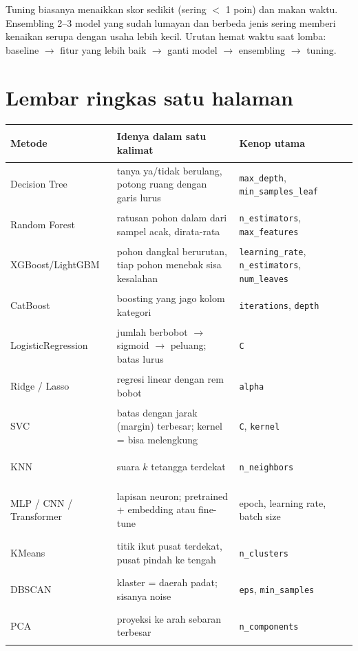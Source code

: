 \documentclass[10pt,a4paper]{article}
\newcommand{\kode}[1]{\texttt{\small #1}}
\begin{document}
\begin{kenapa}
Tuning biasanya menaikkan skor sedikit (sering $<$ 1 poin) dan makan waktu. Ensembling 2--3 model yang sudah lumayan dan
berbeda jenis sering memberi kenaikan serupa dengan usaha lebih kecil. Urutan hemat waktu saat lomba: baseline $\to$ fitur
yang lebih baik $\to$ ganti model $\to$ ensembling $\to$ tuning.
\end{kenapa}

\clearpage
\section*{Lembar ringkas satu halaman}
{\small
\begin{tabularx}{\linewidth}{@{}>{\bfseries\raggedright\arraybackslash}p{3.3cm}XP{4.0cm}@{}}
\toprule
Metode & Idenya dalam satu kalimat & Kenop utama\\ \midrule
Decision Tree & tanya ya/tidak berulang, potong ruang dengan garis lurus & \kode{max\_depth}, \kode{min\_samples\_leaf}\\
Random Forest & ratusan pohon dalam dari sampel acak, dirata-rata & \kode{n\_estimators}, \kode{max\_features}\\
XGBoost/LightGBM & pohon dangkal berurutan, tiap pohon menebak sisa kesalahan & \kode{learning\_rate}, \kode{n\_estimators}, \kode{num\_leaves}\\
CatBoost & boosting yang jago kolom kategori & \kode{iterations}, \kode{depth}\\
LogisticRegression & jumlah berbobot $\to$ sigmoid $\to$ peluang; batas lurus & \kode{C}\\
Ridge / Lasso & regresi linear dengan rem bobot & \kode{alpha}\\
SVC & batas dengan jarak (margin) terbesar; kernel = bisa melengkung & \kode{C}, \kode{kernel}\\
KNN & suara $k$ tetangga terdekat & \kode{n\_neighbors}\\
MLP / CNN / Transformer & lapisan neuron; pretrained + embedding atau fine-tune & epoch, learning rate, batch size\\
KMeans & titik ikut pusat terdekat, pusat pindah ke tengah & \kode{n\_clusters}\\
DBSCAN & klaster = daerah padat; sisanya noise & \kode{eps}, \kode{min\_samples}\\
PCA & proyeksi ke arah sebaran terbesar & \kode{n\_components}\\

\end{tabularx}}
\end{document}
